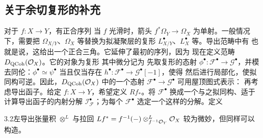 \subsection{关于余切复形的补充}
对于 $f:X\to Y$，有正合序列
当 $f$ 光滑时，箭头 $f^*\Omega_Y\to\Omega_X$ 为单射。一般情况下，需要把 $\Omega_{X/Y}$、$\Omega_X$ 等替换为拟凝聚层的复形 $L^\bullet_{X/Y}$、$L^\bullet_X$ 等。导出范畴中有
也就是说，这给出一个正合三角。它延伸了最初的序列，因为
现在定义范畴 $D_{\mathrm{QCoh}}(\mathcal O_X)$。它的对象为复形
其中微分记为
先取复形的态射 $\phi^\bullet:\mathcal F^\bullet\to \mathcal G^\bullet$，并模去同伦：$\phi^\bullet\simeq\psi^\bullet$ 当且仅当存在 $h^\bullet:\mathcal F^\bullet\to \mathcal G^\bullet[-1]$，使得
然后进行局部化，使拟同构可逆。因此，$D_{\mathrm{QCoh}}(\mathcal O_X)$ 中的一个态射 $\mathcal F^\bullet\to \mathcal G^\bullet$ 可用屋顶图式表示：
再考虑导出函子。给定 $f:X\to Y$，希望定义 $Rf_*$。将 $\mathcal F^\bullet$ 换成一个与之拟同构、适于计算导出函子的内射分解 $\mathcal I_{\mathcal F}^\bullet$；为每个 $\mathcal F^\bullet$ 选定一个这样的分解。定义
\begin{Note}{3.2}左导出张量积 $\otimes^L$ 与拉回 $Lf^*=f^{-1}(-)\otimes^L_{f^{-1}\mathcal O_Y}\mathcal O_X$ 较为微妙，但同样可以构造。\end{Note}

